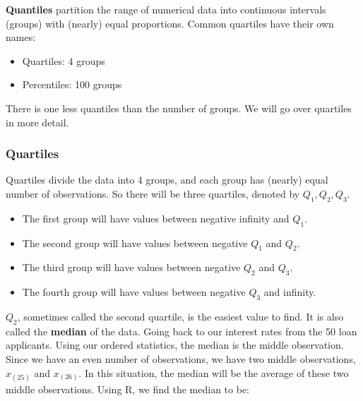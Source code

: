 \documentclass[
]{book}
\newenvironment{Shaded}{\begin{snugshade}}{\end{snugshade}}
\newcommand{\FunctionTok}[1]{\textcolor[rgb]{0.13,0.29,0.53}{\textbf{#1}}}
\newcommand{\NormalTok}[1]{#1}
\newcommand{\SpecialCharTok}[1]{\textcolor[rgb]{0.81,0.36,0.00}{\textbf{#1}}}
\providecommand{\tightlist}{%
  \setlength{\itemsep}{0pt}\setlength{\parskip}{0pt}}
\begin{document}
\textbf{Quantiles} partition the range of numerical data into continuous intervals (groups) with (nearly) equal proportions. Common quartiles have their own names:

\begin{itemize}
\tightlist
\item
  Quartiles: 4 groups
\item
  Percentiles: 100 groups
\end{itemize}

There is one less quantiles than the number of groups. We will go over quartiles in more detail.

\subsubsection{Quartiles}\label{quart}

Quartiles divide the data into 4 groups, and each group has (nearly) equal number of observations. So there will be three quartiles, denoted by \(Q_1, Q_2, Q_3\).

\begin{itemize}
\tightlist
\item
  The first group will have values between negative infinity and \(Q_1\).
\item
  The second group will have values between negative \(Q_1\) and \(Q_2\).
\item
  The third group will have values between negative \(Q_2\) and \(Q_3\).
\item
  The fourth group will have values between negative \(Q_3\) and infinity.
\end{itemize}

\(Q_2\), sometimes called the second quartile, is the easiest value to find. It is also called the \textbf{median} of the data. Going back to our interest rates from the 50 loan applicants. Using our ordered statistics, the median is the middle observation. Since we have an even number of observations, we have two middle observations, \(x_{(25)}\) and \(x_{(26)}\). In this situation, the median will be the average of these two middle observations. Using R, we find the median to be:

\begin{Shaded}
\end{Shaded}
\end{document}
